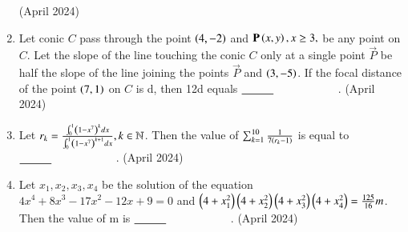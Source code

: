 \documentclass[journal,12pt,onecolumn]{IEEEtran}
\theoremstyle{remark}
\begin{document}
\begin{enumerate}
\hfill{(April 2024)} 
\item Let  conic $C$ pass through the point $\left(4,-2\right)$ and $\mathbf{P}\left(x,y\right),x \geq 3,$ be any point on $C$. Let the slope of the line touching the conic $C$ only at a single point $\vec{P}$ be half the slope of the line joining the points $\vec{P}$ and $\left(3,-5\right)$. If the focal distance of the point $\left(7,1\right)$ on $C$ is d, then 12d equals  $\makebox[3cm][l]{\underline{\hspace{1cm}}}$.
\hfill{(April 2024)} 
\item Let $r_k=\frac{\int_0^1\left(1-x^7\right)^kdx}{\int_0^1\left(1-x^7\right)^{k+1}dx},k \in \mathbb{N}$. Then the value of $\sum_{k=1}^{10}\frac{1}{7\left(r_k-1\right)}$ is equal to $\makebox[3cm][l]{\underline{\hspace{1cm}}}$.
\hfill{(April 2024)} 
\item Let $x_1,x_2,x_3,x_4$ be the solution of the equation $4x^4+8x^3-17x^2-12x+9=0$ and $\left(4+x_1^2\right)\left(4+x_2^2\right)\left(4+x_3^2\right)\left(4+x_4^2\right)=\frac{125}{16}m$. Then the value of m is $\makebox[3cm][l]{\underline{\hspace{1cm}}}$.
\hfill{(April 2024)} 

    \end{enumerate}
\end{document}
